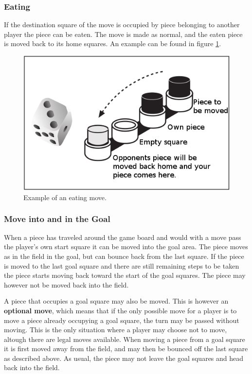 \documentclass[10pt,a4paper]{article}
\begin{document}
\subsubsection{Eating}
\label{sec:eat}

If the destination square of the move is occupied by piece belonging to another player the piece can be eaten. The move is made as normal, and the eaten piece is moved back to its home squares. An example can be found in figure \ref{fig:move-eat}.

\begin{figure}[H]
\begin{center}
\includegraphics[width=.4\linewidth]{move-2.png}
\end{center}
\caption{Example of an eating move.}
\label{fig:move-eat}
\end{figure}

\subsubsection{Move into and in the Goal}

When a piece has traveled around the game board and would with a move pass the player's own start square it can be moved into the goal area. The piece moves as in the field in the goal, but can bounce back from the last square. If the piece is moved to the last goal square and there are still remaining steps to be taken the piece starts moving back toward the start of the goal squares. The piece may however not be moved back into the field.

A piece that occupies a goal square may also be moved. This is however an \textbf{optional move}, which means that if the only possible move for a player is to move a piece already occupying a goal square, the turn may be passed without moving. This is the only situation where a player may choose not to move, altough there are legal moves available. When moving a piece from a goal square it is first moved away from the field, and may then be bounced off the last square as described above. As usual, the piece may not leave the goal squares and head back into the field.
\end{document}
